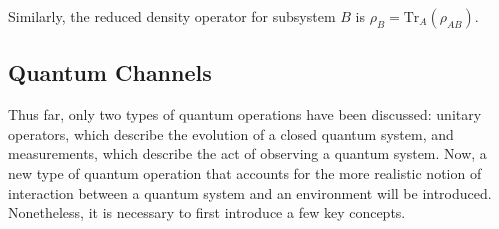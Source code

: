 Similarly, the reduced density operator for subsystem $B$ is $\rho_{B} = \text{Tr}_{A}(\rho_{AB})$.









\subsection{Quantum Channels}


Thus far, only two types of quantum operations have been discussed: unitary operators, which describe the evolution of a closed quantum system, and measurements, which describe the act of observing a quantum system. Now, a new type of quantum operation that accounts for the more realistic notion of interaction between a quantum system and an environment will be introduced. Nonetheless, it is necessary to first introduce a few key concepts.



